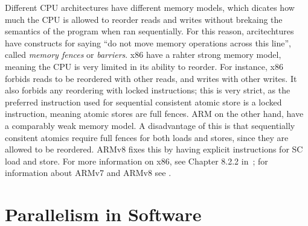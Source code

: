 \documentclass[a4paper,twoside]{report}
\begin{document}
 Different CPU architectures have different memory models, which
dicates how much the CPU is allowed to reorder reads and writes without
brekaing the semantics of the program when ran sequentially.  For this reason,
arcitechtures have constructs for saying ``do not move memory operations across
this line'', called \emph{memory fences} or \emph{barriers}.  x86 have a rahter
strong memory model, meaning the CPU is very limited in its ability to reorder.
For instance, x86 forbids reads to be reordered with other reads, and writes
with other writes. It also forbids any reordering with locked instructions;
this is very strict, as the preferred instruction used for sequential
consistent atomic store is a locked instruction, meaning atomic stores are full
fences.  ARM on the other hand, have a comparably weak memory model. A
disadvantage of this is that sequentially consitent atomics require full fences
for both loads and stores, since they are allowed to be reordered.  ARMv8 fixes
this by having explicit instructions for SC load and store.  For more
information on x86, see Chapter 8.2.2 in~\cite{intel64}; for information about
ARMv7 and ARMv8 see .





\section{Parallelism in Software}
\end{document}

